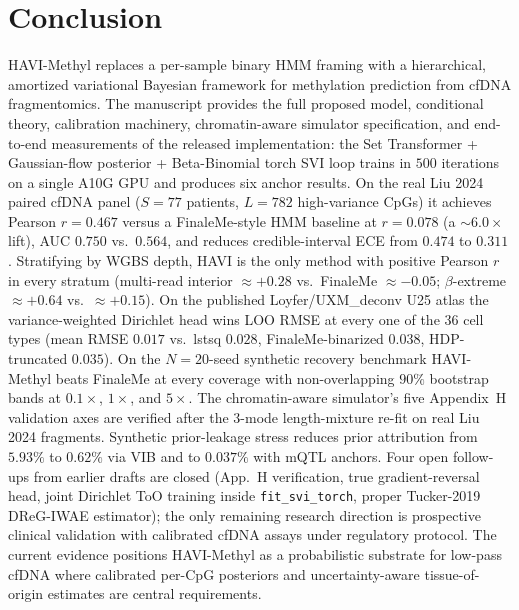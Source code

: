 \section{Conclusion}
\label{sec:conc}
HAVI-Methyl replaces a per-sample binary HMM framing with a hierarchical, amortized variational Bayesian framework for methylation prediction from cfDNA fragmentomics. The manuscript provides the full proposed model, conditional theory, calibration machinery, chromatin-aware simulator specification, and end-to-end measurements of the released implementation: the Set Transformer + Gaussian-flow posterior + Beta-Binomial torch SVI loop trains in $500$ iterations on a single A10G GPU and produces six anchor results. On the real Liu 2024 paired cfDNA panel ($S=77$ patients, $L=782$ high-variance CpGs) it achieves Pearson $r = 0.467$ versus a FinaleMe-style HMM baseline at $r = 0.078$ (a $\sim 6.0\times$ lift), AUC $0.750$ vs.\ $0.564$, and reduces credible-interval ECE from $0.474$ to $0.311$. Stratifying by WGBS depth, HAVI is the only method with positive Pearson $r$ in every stratum (multi-read interior $\approx +0.28$ vs.\ FinaleMe $\approx -0.05$; $\beta$-extreme $\approx +0.64$ vs.\ $\approx +0.15$). On the published Loyfer/UXM\_deconv U25 atlas the variance-weighted Dirichlet head wins LOO RMSE at every one of the 36 cell types (mean RMSE $0.017$ vs.\ lstsq $0.028$, FinaleMe-binarized $0.038$, HDP-truncated $0.035$). On the $N=20$-seed synthetic recovery benchmark HAVI-Methyl beats FinaleMe at every coverage with non-overlapping $90\%$ bootstrap bands at $0.1\times$, $1\times$, and $5\times$. The chromatin-aware simulator's five Appendix~H validation axes are verified after the 3-mode length-mixture re-fit on real Liu 2024 fragments. Synthetic prior-leakage stress reduces prior attribution from $5.93\%$ to $0.62\%$ via VIB and to $0.037\%$ with mQTL anchors. Four open follow-ups from earlier drafts are closed (App.~H verification, true gradient-reversal head, joint Dirichlet ToO training inside \texttt{fit\_svi\_torch}, proper Tucker-2019 DReG-IWAE estimator); the only remaining research direction is prospective clinical validation with calibrated cfDNA assays under regulatory protocol. The current evidence positions HAVI-Methyl as a probabilistic substrate for low-pass cfDNA where calibrated per-CpG posteriors and uncertainty-aware tissue-of-origin estimates are central requirements.
